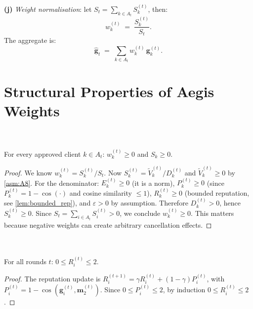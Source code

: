 \documentclass[../main]{subfiles}
\begin{document}
\textbf{(j)} \emph{Weight normalisation}: let $S_t = \sum_{k \in A_t} S_k^{(t)}$, then:
\begin{equation}
    w_k^{(t)} \;=\; \frac{S_k^{(t)}}{S_t}.
    \label{eq:weight_normalisation}
\end{equation}
The \aegis{} aggregate is:
\begin{equation}
    \hat{\mathbf{g}}_t \;=\; \sum_{k \in A_t} w_k^{(t)}\, \mathbf{g}_k^{(t)}.
    \label{eq:aegis_aggregate}
\end{equation}
\section{Structural Properties of Aegis Weights}
\label{app:weight_properties}

\begin{lemma}
\hfill \\\label{lem:nonneg_weights}
\hfill \\
For every approved client $k \in A_t$: $w_k^{(t)} \geq 0$ and $S_k \geq 0$.
\end{lemma}

\begin{proof}
We know $w_k^{(t)} = S_k^{(t)} / S_t$.
Now $S_k^{(t)} = \widetilde{V}_k^{(t)} / D_k^{(t)}$ and $\widetilde{V}_k^{(t)} \geq 0$
by \cref{asm:A8}. For the denominator:
$E_k^{(t)} \geq 0$ (it is a norm), $P_k^{(t)} \geq 0$
(since $P_k^{(t)} = 1 - \cos(\cdot)$ and cosine similarity $\leq 1$),
$R_k^{(t)} \geq 0$ (bounded reputation, see \cref{lem:bounded_rep}), and
$\varepsilon > 0$ by assumption.
Therefore $D_k^{(t)} > 0$, hence $S_k^{(t)} \geq 0$.
Since $S_t = \sum_{i \in A_t} S_i^{(t)} > 0$, we conclude $w_k^{(t)} \geq 0$.
This matters because negative weights can create arbitrary cancellation effects.
\end{proof}

\begin{lemma}
\hfill \\\label{lem:bounded_rep}
\hfill \\
For all rounds $t$: $0 \leq R_i^{(t)} \leq 2$.
\end{lemma}

\begin{proof}
The reputation update is $R_i^{(t+1)} = \gamma R_i^{(t)} + (1-\gamma) P_i^{(t)}$,
with $P_i^{(t)} = 1 - \cos(\mathbf{g}_i^{(t)}, \mathbf{m}_2^{(t)})$.
Since $0 \leq P_i^{(t)} \leq 2$, by induction $0 \leq R_i^{(t)} \leq 2$.
\end{proof}
\end{document}
